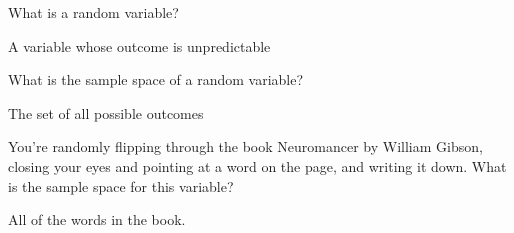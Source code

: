 \documentclass[11pt]{exam}
\begin{document}
\begin{questions}

    \question[3] What is a random variable?
    \begin{solutionordottedlines}[0.3in]
      A variable whose outcome is unpredictable
    \end{solutionordottedlines}
    \question[3] What is the sample space of a random variable?
    \begin{solutionordottedlines}[0.3in]
      The set of all possible outcomes
    \end{solutionordottedlines}
    \question[3] You're randomly flipping through the book Neuromancer by William
    Gibson, closing your eyes and pointing at a word on the page, and
    writing it down.  What is the sample space for this variable?
    \begin{solutionordottedlines}[0.3in]
      All of the words in the book.
    \end{solutionordottedlines}


\end{questions}
\end{document}
